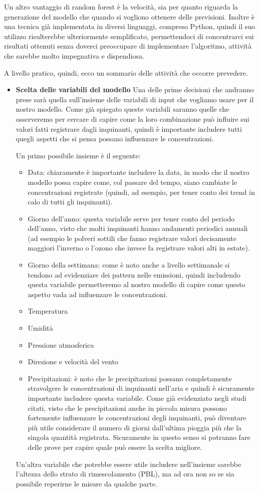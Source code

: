 \documentclass{article}
\begin{document}
Un altro vantaggio di random forest è la velocità, sia per quanto riguarda la generazione del modello che quando si vogliono ottenere delle previsioni. Inoltre è una tecnica già implementata in diversi linguaggi, compreso Python, quindi il suo utilizzo risulterebbe ulteriormente semplificato, permettendoci di concentrarci sui risultati ottenuti senza doverci preoccupare di implementare l'algoritmo, attività che sarebbe molto impegnativa e dispendiosa.

A livello pratico, quindi, ecco un sommario delle attività che occorre prevedere.
\begin{itemize}
\item \textbf{Scelta delle variabili del modello}
Una delle prime decisioni che andranno prese sarà quella sull'insieme delle variabili di input che vogliamo usare per il nostro modello. Come già spiegato queste variabili saranno quelle che osserveremo per cercare di capire come la loro combinazione può influire sui valori fatti registrare dagli inquinanti, quindi è importante includere tutti quegli aspetti che si pensa possano influenzare le concentrazioni.

Un primo possibile insieme è il seguente:
\begin{itemize}
\item Data: chiaramente è importante includere la data, in modo che il nostro modello possa capire come, col passare del tempo, siano cambiate le concentrazioni registrate (quindi, ad esempio, per tener conto dei trend in calo di tutti gli inquinanti).
\item Giorno dell'anno: questa variabile serve per tener conto del periodo dell'anno, visto che molti inquinanti hanno andamenti periodici annuali (ad esempio le polveri sottili che fanno registrare valori decisamente maggiori l'inverno o l'ozono che invece fa registrare valori alti in estate).
\item Giorno della settimana: come è noto anche a livello settimanale si tendono ad evidenziare dei pattern nelle emissioni, quindi includendo questa variabile permetteremo al nostro modello di capire come questo aspetto vada ad influenzare le concentrazioni.
\item Temperatura
\item Umidità
\item Pressione atmosferica
\item Direzione e velocità del vento
\item Precipitazioni: è noto che le precipitazioni possano completamente stravolgere le concentrazioni di inquinanti nell'aria e quindi è sicuramente importante includere questa variabile. Come già evidenziato negli studi citati, visto che le precipitazioni anche in piccola misura possono fortemente influenzare le concentrazioni degli inquinanti, può diventare più utile considerare il numero di giorni dall'ultima pioggia più che la singola quantità registrata. Sicuramente in questo senso si potranno fare delle prove per capire quale può essere la scelta migliore.
\end{itemize}
Un'altra variabile che potrebbe essere utile includere nell'insieme sarebbe l'altezza dello strato di rimescolamento (PBL), ma ad ora non so se sia possibile reperirne le misure da qualche parte.


\end{itemize}
\end{document}
